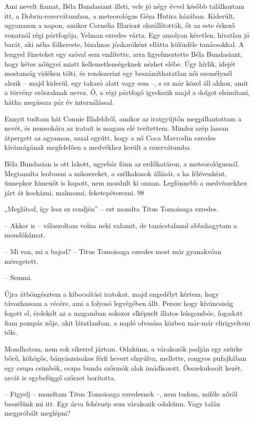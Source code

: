 \documentclass{IEEEtran}
\begin{document}
Ami nevelt fiamat, Béla Bundasiant illeti, vele jó négy évvel később
találkoztam itt, a Dobrin-rezervátumban, a meteorológus Géza Hutira házában.
Kiderült, ugyanazon a napon, amikor Cornelia Illariont elszállították, őt az
este érkező vonatnál régi pártfogója, Velman ezredes várta. Egy amolyan
kéretlen, hívatlan jó barát, aki néha fölkereste, bizalmas jóakaróként ellátta
különféle tanácsokkal. A lengyel füzeteket egy szóval sem említette, arra
figyelmeztette Béla Bundasiant, hogy kétes nőügyei miatt kellemetlenségeknek
nézhet elébe. Úgy hírlik, idejét mostanság vidéken tölti, és rendszerint egy
beszámíthatatlan női személynél alszik – majd kiderül, egy takaró alatt vagy
sem –, s ez már közel áll ahhoz, amit a törvény erőszaknak nevez. Ő, a régi
pártfogó igyekszik majd a dolgot elsimítani, hátha megússza pár év
internálással.

Ennyit tudtam hát Connie Illafeldről, amikor az iratgyűjtőn megpillantottam a
nevét, és nemsokára az iratait is magam elé terítettem. Mindez szép lassan
átpergett az agyamon, azzal együtt, hogy a nő Coca Mavrodin ezredes
kívánságának megfelelően a medvékhez került a rezervátumba.

Béla Bundasian is ott lakott, ugyebár fönn az erdőhatáron, a meteorológusnál.
Megtanulta leolvasni a műszereket, a szélkakasok állását, s ha félévenként,
ünnepkor kimenőt is kapott, nem mozdult ki onnan. Legfönnebb a medvészekhez
járt át kockázni, malmozni, feketepéterezni.
98

„Meglátod, így lesz ez rendjén” – ezt mondta Titus Tomoioaga ezredes.

– Akkor is – válaszoltam volna neki valamit, de tanácstalanul abbahagytam a
mondókámat.

– Mi van, mi a bajod? – Titus Tomoioaga ezredes most már gyanakvóan
méregetett.

– Semmi.

Újra átböngésztem a kibocsátási iratokat, majd engedélyt kértem, hogy
távozhassam a vécére, ami a folyosó legvégében állt. Persze hogy kíváncsiság
fogott el, érdekelt az a magamban sokszor elképzelt illatos húsgombóc,
fogadott fiam pompás nője, akit látatlanban, a napló olvasása közben már-már
elirigyeltem tőle.

Mondhatom, nem sok sikerrel jártam. Odakünn, a várakozók padján egy szürke
bőrű, köhögős, bányászsisakos férfi hevert elnyúlva, mellette, rongyos
pufajkában egy csupa csimbók, csupa bunda szőrmók alak imádkozott.
Összekulcsolt kezét, arcát is egybefüggő szőrzet borította.

– Figyelj – mondtam Titus Tomoioaga ezredesnek –, nem tudom, miféle nőről
beszélünk mi itt. Egy árva fehérnép sem várakozik odakünn. Vagy talán
megpróbált meglépni?
\end{document}

